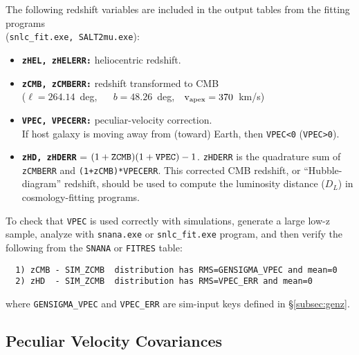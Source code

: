 \documentclass[12pt]{article}
\begin{document}
The following redshift variables are included in the output tables
from the fitting programs \\ ({\tt snlc\_fit.exe, SALT2mu.exe}):
\begin{itemize}
   \item {\bf\tt zHEL, zHELERR:} heliocentric redshift.
   \item {\bf\tt zCMB, zCMBERR:} redshift transformed to CMB  \\
      ($\ell=264.14$~deg, ~~ $b=48.26$~deg,~~${\rm v}_{\rm apex} = 370$~km/s)
   \item {\bf\tt VPEC, VPECERR:} peculiar-velocity correction.  \\
           If host galaxy is moving away from (toward) Earth, 
            then {\tt VPEC<0} ({\tt VPEC>0}).
   \item {\bf\tt zHD, zHDERR} = $(1+{\rm\tt ZCMB})(1+{\rm\tt VPEC}) - 1$. 
         {\tt zHDERR} is the quadrature sum of {\tt zCMBERR} and 
           {\tt (1+zCMB)*VPECERR}.
         This corrected CMB redshift, or ``Hubble-diagram'' redshift, 
         should be used to compute the 
         luminosity distance ($D_L$) in cosmology-fitting programs.
\end{itemize} 
%
To check that {\tt VPEC} is used correctly with simulations,
generate a large low-z sample, analyze with {\tt snana.exe} or
{\tt snlc\_fit.exe} program, and then verify the following from
the {\tt SNANA} or {\tt FITRES} table:
\begin{verbatim}
  1) zCMB - SIM_ZCMB  distribution has RMS=GENSIGMA_VPEC and mean=0
  2) zHD  - SIM_ZCMB  distribution has RMS=VPEC_ERR and mean=0
\end{verbatim}
%
where  {\tt GENSIGMA\_VPEC} and {\tt VPEC\_ERR} are sim-input
keys defined in  \S\ref{subsec:genz}.

   \clearpage
   \subsection{Peculiar Velocity Covariances}
   \label{subsec:mucovar}


\newcommand{\Vinv}{V_{ij}^{-1}}
\end{document}
